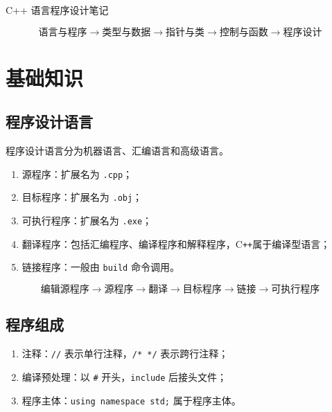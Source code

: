 \documentclass[UTF8,fontset=fandol,zihao=5]{ctexart}
\newcommand{\code}[1]{\texttt{#1}}
\newcommand{\cpp}{C\texttt{++}}
\begin{document}
\begin{center}
  {\heiti\headingfont{}\color{main} C++ 语言程序设计笔记}
\end{center}

\vspace{0.45em}

\begin{relationbox}
\[
  \boxed{\text{语言与程序}}
  \longrightarrow
  \boxed{\text{类型与数据}}
  \longrightarrow
  \boxed{\text{指针与类}}
  \longrightarrow
  \boxed{\text{控制与函数}}
  \longrightarrow
  \boxed{\text{程序设计}}
\]
\end{relationbox}

\section{基础知识}

\subsection{程序设计语言}

程序设计语言分为机器语言、汇编语言和高级语言。

\begin{enumerate}
  \item 源程序：扩展名为 \code{.cpp}；
  \item 目标程序：扩展名为 \code{.obj}；
  \item 可执行程序：扩展名为 \code{.exe}；
  \item 翻译程序：包括汇编程序、编译程序和解释程序，\cpp 属于编译型语言；
  \item 链接程序：一般由 \code{build} 命令调用。
\end{enumerate}

\[
\boxed{\text{编辑源程序}}
\to \text{源程序}
\to \boxed{\text{翻译}}
\to \text{目标程序}
\to \boxed{\text{链接}}
\to \text{可执行程序}
\]

\subsection{程序组成}

\begin{enumerate}
  \item 注释：\code{//} 表示单行注释，\code{/* */} 表示跨行注释；
  \item 编译预处理：以 \code{\#} 开头，\code{include} 后接头文件；
  \item 程序主体：\code{using namespace std;} 属于程序主体。
\end{enumerate}
\end{document}
